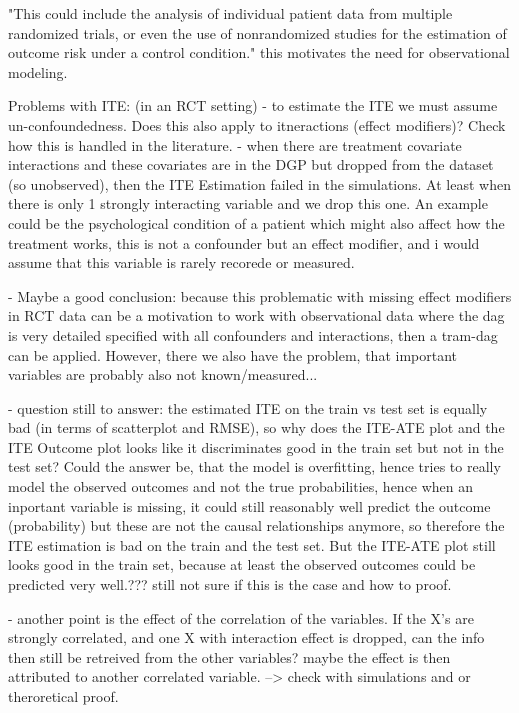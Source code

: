  "This could include the analysis of individual patient data from multiple randomized trials, or even the use of nonrandomized studies for the estimation of outcome risk under a control condition." this motivates the need for observational modeling.


Problems with ITE: (in an RCT setting)
- to estimate the ITE we must assume un-confoundedness. Does this also apply to itneractions (effect modifiers)? Check how this is handled in the literature.
- when there are treatment covariate interactions and these covariates are in the DGP but dropped from the dataset (so unobserved), then the ITE Estimation failed in the simulations. At least when there is only 1 strongly interacting variable and we drop this one. An example could be the psychological condition of a patient which might also affect how the treatment works, this is not a confounder but an effect modifier, and i would assume that this variable is rarely recorede or measured.

- Maybe a good conclusion: because this problematic with missing effect modifiers in RCT data can be a motivation to work with observational data where the dag is very detailed specified with all confounders and interactions, then a tram-dag can be applied. However, there we also have the problem, that important variables are probably also not known/measured...

- question still to answer: the estimated ITE on the train vs test set is equally bad (in terms of scatterplot and RMSE), so why does the ITE-ATE plot and the ITE Outcome plot looks like it discriminates good in the train set but not in the test set? Could the answer be, that the model is overfitting, hence tries to really model the observed outcomes and not the true probabilities, hence when an inportant variable is missing, it could still reasonably well predict the outcome (probability) but these are not the causal relationships anymore, so therefore the ITE estimation is bad on the train and the test set. But the ITE-ATE plot still looks good in the train set, because at least the observed outcomes could be predicted very well.??? still not sure if this is the case and how to proof.

- another point is the effect of the correlation of the variables. If the X's are strongly correlated, and one X with interaction effect is dropped, can the info then still be retreived from the other variables? maybe the effect is then attributed to another correlated variable. --> check with simulations and or theroretical proof.




